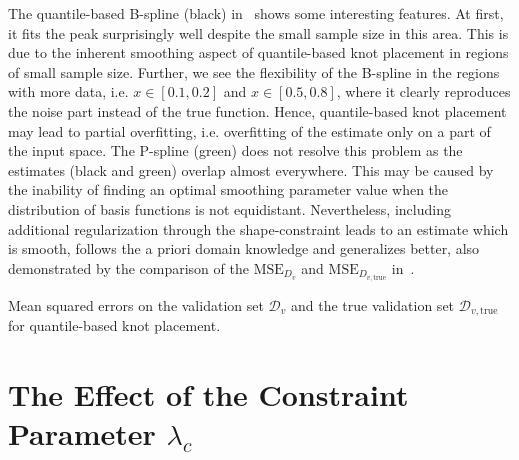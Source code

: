 The quantile-based B-spline (black) in~ shows some interesting features. At first, it fits the peak surprisingly well despite the small sample size in this area. This is due to the inherent smoothing aspect of quantile-based knot placement in regions of small sample size. Further, we see the flexibility of the B-spline in the regions with more data, i.e. $x\in[0.1,0.2]$ and $x \in [0.5,0.8]$, where it clearly reproduces the noise part instead of the true function. Hence, quantile-based knot placement may lead to partial overfitting, i.e. overfitting of the estimate only on a part of the input space. The P-spline (green) does not resolve this problem as the estimates (black and green) overlap almost everywhere. This may be caused by the inability of finding an optimal smoothing parameter value when the distribution of basis functions is not equidistant. Nevertheless, including additional regularization through the shape-constraint leads to an estimate which is smooth, follows the a priori domain knowledge and generalizes better, also demonstrated by the comparison of the $\text{MSE}_{D_v}$ and $\text{MSE}_{D_{v, \mathrm{true}}}$ in~.


\begin{table}[H]
	\begin{center}
	\end{center}
	\caption{Mean squared errors on the validation set $\mathcal{D}_v$ and the true validation set $\mathcal{D}_{v,\mathrm{true}}$ for quantile-based knot placement.}
	\label{tab:sparse-example-quantile}
\end{table}



\section{The Effect of the Constraint Parameter $\lambda_c$} \label{sec:lambda_c_sec}

